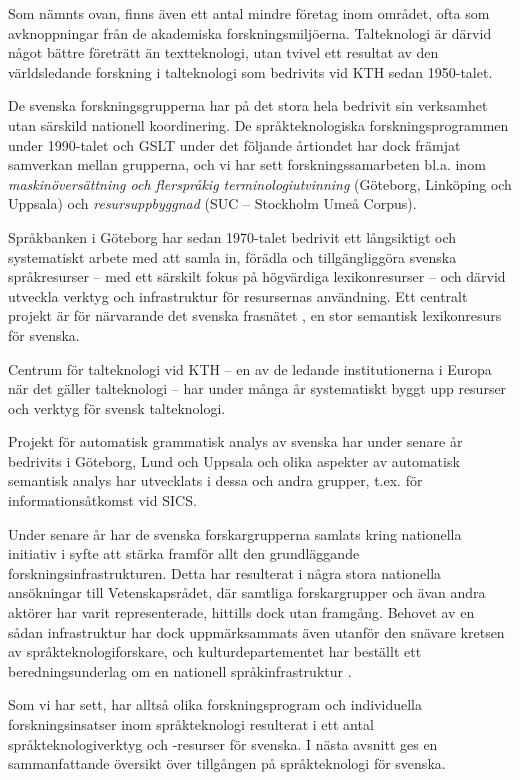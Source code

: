 \begin{multicols}{2}
Som nämnts ovan, finns även ett antal mindre företag inom området,
ofta som avknoppningar från de akademiska
forsknings\-miljöerna. Talteknologi är därvid något bättre företrätt
än textteknologi, utan tvivel ett resultat av den världsledande
forskning i talteknologi som bedrivits vid KTH sedan 1950-talet.

De svenska forsk\-nings\-grupperna har på det stora hela bedrivit sin
verk\-sam\-het utan särskild nationell koordinering. De
språkteknologiska forskningsprogrammen under 1990-talet och GSLT under
det följande årtiondet har dock främjat samverkan mellan grupperna,
och vi har sett forsknings\-samarbeten bl.a. inom
\emph{maskin\-över\-sätt\-ning och flerspråkig terminologiutvinning}
(Göteborg, Linköping och Uppsala) och \emph{resursuppbyggnad} (SUC --
Stockholm Umeå Corpus).

Språkbanken i Göteborg har sedan 1970-talet bedrivit ett långsiktigt
och systematiskt arbete med att samla in, förädla och tillgängliggöra
svenska språkresurser -- med ett särskilt fokus på högvärdiga
lexikonresurser -- och därvid utveckla verktyg och infrastruktur för
resursernas användning. Ett centralt projekt är för närvarande det
svenska frasnätet \cite{swefn}, en stor semantisk lexikonresurs för
svenska.

Centrum för talteknologi vid KTH -- en av de ledande institutionerna i
Europa när det gäller talteknologi -- har under många år systematiskt
byggt upp resurser och verktyg för svensk talteknologi.

Projekt för automatisk grammatisk analys av svenska har under senare
år bedrivits i Göteborg, Lund och Uppsala och olika aspekter av
automatisk semantisk analys har utvecklats i dessa och andra grupper,
t.ex. för informationsåtkomst vid SICS.

Under senare år har de svenska forskargrupperna samlats kring
nationella initiativ i syfte att stärka framför allt den grundläggande
forsk\-nings\-infra\-strukturen. Detta har resulterat i några stora
nationella ansökningar till Vetenskapsrådet, där samtliga
forskargrupper och ävan andra aktörer har varit representerade,
hittills dock utan framgång. Behovet av en sådan infra\-struktur har
dock uppmärksammats även utanför den snävare kretsen av
språkteknologiforskare, och kulturdepartementet har beställt ett
beredningsunderlag om en nationell språk\-infra\-struk\-tur
\cite{infrarapport}.

Som vi har sett, har alltså olika forskningsprogram och individuella
forskningsinsatser inom språkteknologi resulterat i ett antal
språkteknologiverktyg och -resurser för svenska. I nästa avsnitt ges
en sammanfattande översikt över tillgången på språkteknologi för
svenska.


\end{multicols}
